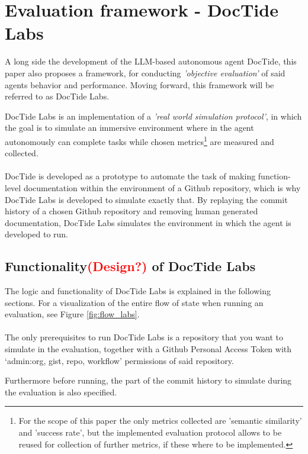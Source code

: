 \section{Evaluation framework - DocTide Labs}
\label{sec:DocTideLabs}
A long side the development of the LLM-based autonomous agent DocTide, this paper also proposes a framework, for conducting \textit{'objective evaluation'}\cite{wang2024survey} of said agents behavior and performance. Moving forward, this framework will be referred to as DocTide Labs.

DocTide Labs is an implementation of a \textit{'real world simulation protocol'}, in which the goal is to simulate an immersive environment where in the agent autonomously can complete tasks while chosen metrics\footnote{For the scope of this paper the only metrics collected are 'semantic similarity' and 'success rate', but the implemented evaluation protocol allows to be reused for collection of further metrics, if these where to be implemented.} are measured and collected\cite{wang2024survey}.
\\ \\
DocTide is developed as a prototype to automate the task of making function-level documentation within the environment of a Github repository, which is why DocTide Labs is developed to simulate exactly that. By replaying the commit history of a chosen Github repository and removing human generated documentation, DocTide Labs simulates the environment in which the agent is developed to run.

\subsection{Functionality\textcolor{red}{(Design?)} of DocTide Labs}
The logic and functionality of DocTide Labs is explained in the following sections. For a visualization of the entire flow of state when running an evaluation, see Figure \ref{fig:flow_labs}.
\\ \\
The only prerequisites to run DocTide Labs is a repository that you want to simulate in the evaluation, together with a Github Personal Access Token with `admin:org, gist, repo, workflow' permissions of said repository.

Furthermore before running, the part of the commit history to simulate during the evaluation is also specified.

